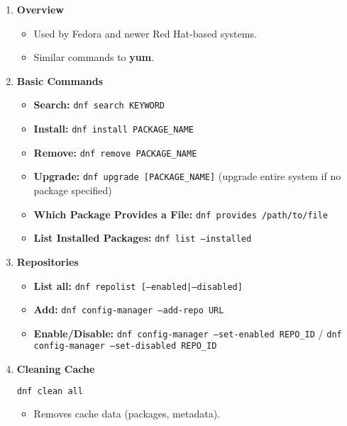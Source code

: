 \documentclass[a4paper]{report}
\begin{document}
\begin{enumerate}
    \item \textbf{Overview}
    \begin{itemize}
        \item Used by Fedora and newer Red Hat-based systems.
        \item Similar commands to \textbf{yum}.
    \end{itemize}

    \item \textbf{Basic Commands}
    \begin{itemize}
        \item \textbf{Search:} \texttt{dnf search KEYWORD}
        \item \textbf{Install:} \texttt{dnf install PACKAGE\_NAME}
        \item \textbf{Remove:} \texttt{dnf remove PACKAGE\_NAME}
        \item \textbf{Upgrade:} \texttt{dnf upgrade [PACKAGE\_NAME]} (upgrade entire system if no package specified)
        \item \textbf{Which Package Provides a File:} \texttt{dnf provides /path/to/file}
        \item \textbf{List Installed Packages:} \texttt{dnf list --installed}
    \end{itemize}

    \item \textbf{Repositories}
    \begin{itemize}
        \item \textbf{List all:} \texttt{dnf repolist [--enabled|--disabled]}
        \item \textbf{Add:} \texttt{dnf config-manager --add-repo URL}
        \item \textbf{Enable/Disable:} \texttt{dnf config-manager --set-enabled REPO\_ID} / \texttt{dnf config-manager --set-disabled REPO\_ID}
    \end{itemize}

    \item \textbf{Cleaning Cache}
    \begin{lstlisting}[language=bash]
dnf clean all
    \end{lstlisting}
    \begin{itemize}
        \item Removes cache data (packages, metadata).
    \end{itemize}
\end{enumerate}
\end{document}
